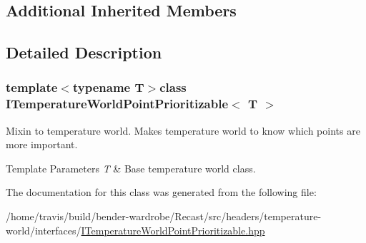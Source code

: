 \subsection*{Additional Inherited Members}


\subsection{Detailed Description}
\subsubsection*{template$<$typename T$>$class I\-Temperature\-World\-Point\-Prioritizable$<$ T $>$}

Mixin to temperature world. Makes temperature world to know which points are more important.


\begin{DoxyTemplParams}{Template Parameters}
{\em T} & Base temperature world class. \\
\hline
\end{DoxyTemplParams}


The documentation for this class was generated from the following file\-:\begin{DoxyCompactItemize}
\item 
/home/travis/build/bender-\/wardrobe/\-Recast/src/headers/temperature-\/world/interfaces/\hyperlink{_i_temperature_world_point_prioritizable_8hpp}{I\-Temperature\-World\-Point\-Prioritizable.\-hpp}\end{DoxyCompactItemize}
